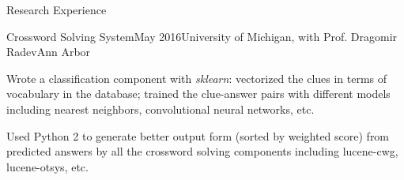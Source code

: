 \documentclass{resume} %
\begin{document}
\begin{rSection}{Research Experience}
	\begin{rSubsection}{Crossword Solving System}{May 2016}{University of Michigan, with Prof. Dragomir Radev}{Ann Arbor}
	\item Wrote a classification component with \textit{sklearn}: vectorized the clues in terms of vocabulary in the database; trained the clue-answer pairs with different models including nearest neighbors, convolutional neural networks, etc.
	\item Used Python 2 to generate better output form (sorted by weighted score) from predicted answers by all the crossword solving components including lucene-cwg, lucene-otsys, etc.
	\end{rSubsection}
\end{rSection}
%
%	
%	
%	
%	
%	
%		
\end{document}
